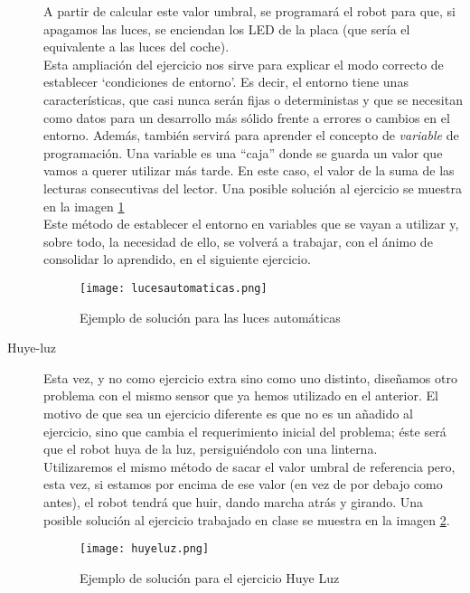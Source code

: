 \begin{description}
A partir de calcular este valor umbral, se programará el robot para que, si apagamos las luces, se enciendan los LED de la placa (que sería el equivalente a las luces del coche).\\
Esta ampliación del ejercicio nos sirve para explicar el modo correcto de establecer `condiciones de entorno'. Es decir, el entorno tiene unas características, que casi nunca serán fijas o deterministas y que se necesitan como datos para un desarrollo más sólido frente a errores o cambios en el entorno. Además, también servirá para aprender el concepto de \textit{variable} de programación. Una variable es una ``caja'' donde se guarda un valor que vamos a querer utilizar más tarde. En este caso, el valor de la suma de las lecturas consecutivas del lector. Una posible solución al ejercicio se muestra en la imagen \ref{img:lucesautomaticas} \\
Este método de establecer el entorno en variables que se vayan a utilizar y, sobre todo, la necesidad de ello, se volverá a trabajar, con el ánimo de consolidar lo aprendido, en el siguiente ejercicio. 
\begin{figure}[h]
	\centering
	\texttt{[image: lucesautomaticas.png]}	
	\caption{Ejemplo de solución para las luces automáticas}
	\label{img:lucesautomaticas}
\end{figure}

\item[Huye-luz]\label{ej:huyeLuz}
Esta vez, y no como ejercicio extra sino como uno distinto, diseñamos otro problema con el mismo sensor que ya hemos utilizado en el anterior. El motivo de que sea un ejercicio diferente es que no es un añadido al ejercicio, sino que cambia el requerimiento inicial del problema; éste será que el robot huya de la luz, persiguiéndolo con una linterna.\\
Utilizaremos el mismo método de sacar el valor umbral de referencia pero, esta vez, si estamos por encima de ese valor (en vez de por debajo como antes), el robot tendrá que huir, dando marcha atrás y girando. Una posible solución al ejercicio trabajado en clase se muestra en la imagen \ref{img:huyeluz}.\\

\begin{figure}[h]
	\centering
	\texttt{[image: huyeluz.png]}	
	\caption{Ejemplo de solución para el ejercicio Huye Luz}
	\label{img:huyeluz}
\end{figure}


\end{description}
